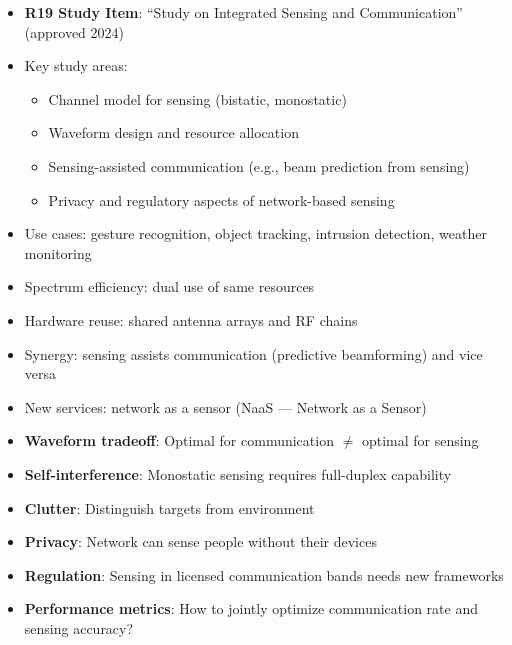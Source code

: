 



\begin{itemize}
\tightlist
\item
  \textbf{R19 Study Item}: ``Study on Integrated Sensing and Communication'' (approved 2024)
\item
  Key study areas:

  \begin{itemize}
  \tightlist
  \item
    Channel model for sensing (bistatic, monostatic)
  \item
    Waveform design and resource allocation
  \item
    Sensing-assisted communication (e.g., beam prediction from sensing)
  \item
    Privacy and regulatory aspects of network-based sensing
  \end{itemize}
\item
  Use cases: gesture recognition, object tracking, intrusion detection, weather monitoring
\end{itemize}


\begin{itemize}
\tightlist
\item
  Spectrum efficiency: dual use of same resources
\item
  Hardware reuse: shared antenna arrays and RF chains
\item
  Synergy: sensing assists communication (predictive beamforming) and vice versa
\item
  New services: network as a sensor (NaaS — Network as a Sensor)
\end{itemize}


\begin{itemize}
\tightlist
\item
  \textbf{Waveform tradeoff}: Optimal for communication \ensuremath{\neq} optimal for sensing
\item
  \textbf{Self-interference}: Monostatic sensing requires full-duplex capability
\item
  \textbf{Clutter}: Distinguish targets from environment
\item
  \textbf{Privacy}: Network can sense people without their devices
\item
  \textbf{Regulation}: Sensing in licensed communication bands needs new frameworks
\item
  \textbf{Performance metrics}: How to jointly optimize communication rate and sensing accuracy?
\end{itemize}

